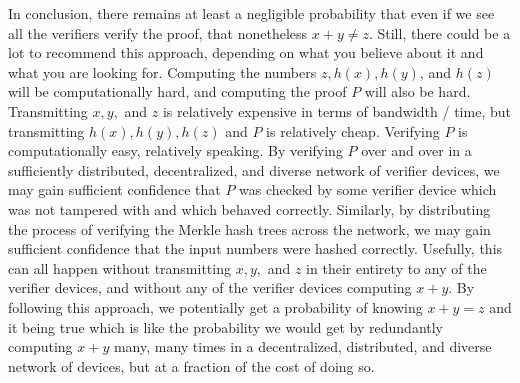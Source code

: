 \documentclass[11pt]{article}
\begin{document}
In conclusion, there remains at least a negligible
probability that even if we see all the verifiers verify the proof, that nonetheless
$x + y \neq z$. Still, there could be a lot to recommend this approach, depending on
what you believe about it and what you are looking for. Computing the numbers $z, h(x), h(y)$,
and $h(z)$ will be computationally hard, and computing the proof $P$ will also be hard.
Transmitting $x, y,$ and $z$ is relatively expensive in terms of bandwidth / time,
but transmitting $h(x), h(y), h(z)$ and $P$ is relatively cheap. Verifying $P$ is
computationally easy, relatively speaking. By verifying $P$ over and over in a sufficiently
distributed, decentralized, and diverse network of verifier devices, we may gain
sufficient confidence that $P$ was checked by some verifier device which was not tampered
with and which behaved correctly. Similarly, by distributing the process of verifying
the Merkle hash trees across the network, we may gain sufficient confidence that the
input numbers were hashed correctly. Usefully, this can all happen without transmitting
$x, y,$ and $z$ in their entirety to any of the verifier devices, and without any
of the verifier devices computing $x + y$. By following this approach, we potentially get
a probability of knowing $x + y = z$ and it being true which is like the probability we
would get by redundantly computing $x + y$ many, many times in a decentralized, distributed,
and diverse network of devices, but at a fraction of the cost of doing so.
\end{document}
